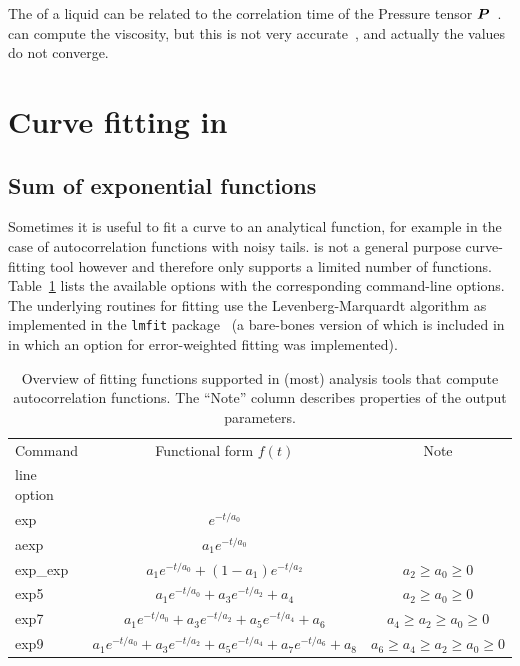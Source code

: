 The  of a liquid can be related to the correlation 
time of the Pressure tensor $\mbox{\boldmath ${P}$}$~\cite{PSmith93c,Balasubramanian96}.
{\tt {}} can compute the viscosity,
but this is not very accurate~\cite{Hess2002a}, and 
actually the values do not converge.

\section{Curve fitting in \gromacs}
\subsection{Sum of exponential functions}
Sometimes it is useful to fit a curve to an analytical function, for
example in the case of autocorrelation functions with noisy
tails. {\gromacs} is not a general purpose curve-fitting tool however
and therefore {\gromacs} only supports a limited number of
functions. 
Table~\ref{tab:fitfn} lists the available options with the
corresponding command-line options. The underlying routines for
fitting use the Levenberg-Marquardt algorithm as implemented in the
{\tt lmfit} package~\cite{lmfit} (a bare-bones version of which is
included in {\gromacs} in which an option for error-weighted fitting
was implemented). 
\begin{table}[ht]
\centering
\caption{Overview of fitting functions supported in (most) analysis tools
  that compute autocorrelation functions. The ``Note'' column describes
  properties of the output parameters.}
\label{tab:fitfn}
\begin{tabular}{lcc}
\hline
Command & Functional form $f(t)$& Note\\
line option         &           & \\
\hline
exp        & $e^{-t/{a_0}}$ &\\
aexp      & $a_1e^{-t/{a_0}}$ &\\
exp_exp & $a_1e^{-t/{a_0}}+(1-a_1)e^{-t/{a_2}}$ & $a_2\ge a_0\ge 0$\\
exp5      & $a_1e^{-t/{a_0}}+a_3e^{-t/{a_2}}+a_4$ &$a_2\ge a_0\ge 0$\\
exp7     &
$a_1e^{-t/{a_0}}+a_3e^{-t/{a_2}}+a_5e^{-t/{a_4}}+a_6$&$a_4\ge a_2\ge
a_0 \ge0$\\
exp9    &
$a_1e^{-t/{a_0}}+a_3e^{-t/{a_2}}+a_5e^{-t/{a_4}}+a_7e^{-t/{a_6}}+a_8$&$a_6\ge
a_4\ge a_2\ge a_0\ge 0$\\
\hline
\end{tabular}
\end{table}

